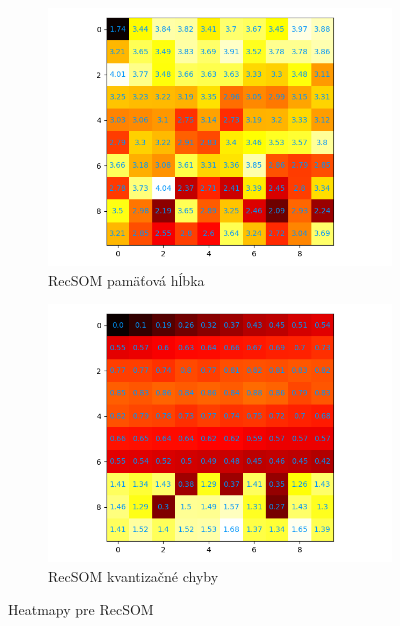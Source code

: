  
\begin{figure}[H]
    \centering
    \begin{subfigure}{.5\textwidth}
        \centering
        \includegraphics[width=\linewidth]{assets/recsom_memory_span}
        \caption{RecSOM pamäťová hĺbka}
        \label{fig:sub1}
    \end{subfigure}%
    \begin{subfigure}{.5\textwidth}
        \centering
        \includegraphics[width=\linewidth]{assets/recsom_quantization_errors}
        \caption{RecSOM kvantizačné chyby}
        \label{fig:sub2}
    \end{subfigure}
    \caption{Heatmapy pre RecSOM}
    \label{fig:test}
\end{figure}

